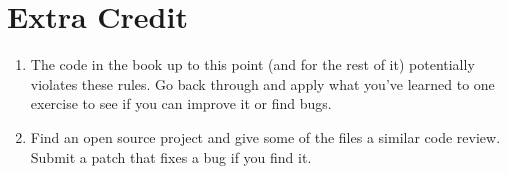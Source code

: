 \section{Extra Credit}

\begin{enumerate}
\item The code in the book up to this point (and for the rest of it) potentially violates these rules.  Go back through and apply what you've learned to one 
    exercise to see if you can improve it or find bugs.
\item Find an open source project and give some of the files a similar code review.  Submit a patch that fixes a bug if you find it.
\end{enumerate}

